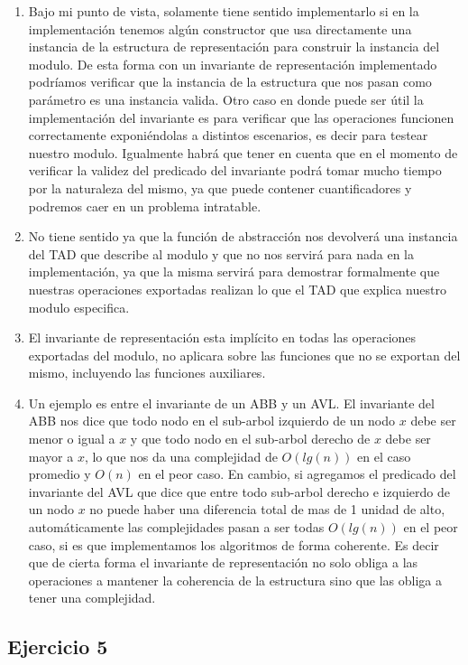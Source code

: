 \documentclass[10pt, a4paper]{article}
\begin{document}
\begin{enumerate}
 \item Bajo mi punto de vista, solamente tiene sentido implementarlo si en la implementaci\'on tenemos alg\'un constructor que usa directamente una instancia de la estructura de representaci\'on para construir la instancia del modulo. De esta forma con un invariante de representaci\'on implementado podr\'iamos verificar que la instancia de la estructura que nos pasan como par\'ametro es una instancia valida. Otro caso en donde puede ser \'util la implementaci\'on del invariante es para verificar que las operaciones funcionen correctamente exponi\'endolas a distintos escenarios, es decir para testear nuestro modulo. Igualmente habr\'a que tener en cuenta que en el momento de verificar la validez del predicado del invariante podr\'a tomar mucho tiempo por la naturaleza del mismo, ya que puede contener cuantificadores y podremos caer en un problema intratable.
 \item No tiene sentido ya que la funci\'on de abstracci\'on nos devolver\'a una instancia del TAD que describe al modulo y que no nos servir\'a para nada en la implementaci\'on, ya que la misma servir\'a para demostrar formalmente que nuestras operaciones exportadas realizan lo que el TAD que explica nuestro modulo especifica.
 \item El invariante de representaci\'on esta impl\'icito en todas las operaciones exportadas del modulo, no aplicara sobre las funciones que no se exportan del mismo, incluyendo las funciones auxiliares.
 \item Un ejemplo es entre el invariante de un ABB y un AVL. El invariante del ABB nos dice que todo nodo en el sub-arbol izquierdo de un nodo $x$ debe ser menor o igual a $x$ y que todo nodo en el sub-arbol derecho de $x$ debe ser mayor a $x$, lo que nos da una complejidad de $O(lg(n))$ en el caso promedio y $O(n)$ en el peor caso. En cambio, si agregamos el predicado del invariante del AVL que dice que entre todo sub-arbol derecho e izquierdo de un nodo $x$ no puede haber una diferencia total de mas de 1 unidad de alto, autom\'aticamente las complejidades pasan a ser todas $O(lg(n))$ en el peor caso, si es que implementamos los algoritmos de forma coherente. Es decir que de cierta forma el invariante de representaci\'on no solo obliga a las operaciones a mantener la coherencia de la estructura sino que las obliga a tener una complejidad.
\end{enumerate}

\subsection*{Ejercicio 5}
\end{document}
